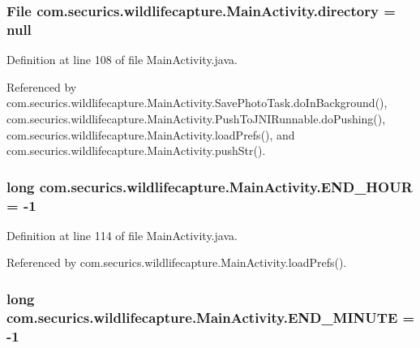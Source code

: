 \subsubsection[{directory}]{\setlength{\rightskip}{0pt plus 5cm}File com.\+securics.\+wildlifecapture.\+Main\+Activity.\+directory = null\hspace{0.3cm}{\ttfamily [private]}}\label{classcom_1_1securics_1_1wildlifecapture_1_1_main_activity_acb6fab88962828f914505962edd3db01}


Definition at line 108 of file Main\+Activity.\+java.



Referenced by com.\+securics.\+wildlifecapture.\+Main\+Activity.\+Save\+Photo\+Task.\+do\+In\+Background(), com.\+securics.\+wildlifecapture.\+Main\+Activity.\+Push\+To\+J\+N\+I\+Runnable.\+do\+Pushing(), com.\+securics.\+wildlifecapture.\+Main\+Activity.\+load\+Prefs(), and com.\+securics.\+wildlifecapture.\+Main\+Activity.\+push\+Str().

\subsubsection[{E\+N\+D\+\_\+\+H\+O\+U\+R}]{\setlength{\rightskip}{0pt plus 5cm}long com.\+securics.\+wildlifecapture.\+Main\+Activity.\+E\+N\+D\+\_\+\+H\+O\+U\+R = -\/1\hspace{0.3cm}{\ttfamily [private]}}\label{classcom_1_1securics_1_1wildlifecapture_1_1_main_activity_adf7bc40f7c3d9baef3787491995092a6}


Definition at line 114 of file Main\+Activity.\+java.



Referenced by com.\+securics.\+wildlifecapture.\+Main\+Activity.\+load\+Prefs().

\subsubsection[{E\+N\+D\+\_\+\+M\+I\+N\+U\+T\+E}]{\setlength{\rightskip}{0pt plus 5cm}long com.\+securics.\+wildlifecapture.\+Main\+Activity.\+E\+N\+D\+\_\+\+M\+I\+N\+U\+T\+E = -\/1\hspace{0.3cm}{\ttfamily [private]}}\label{classcom_1_1securics_1_1wildlifecapture_1_1_main_activity_a9b702aea63fdfdbdbd5775cd9b19c562}


